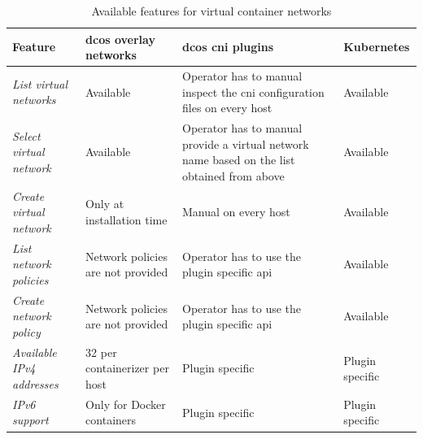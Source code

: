 \begin{table}
\centering
\renewcommand*{\arraystretch}{1.4}
\begin{tabular}{|p{4cm}|p{2.5cm}|p{4cm}|p{2.5cm}|}\hline 
 \textbf{Feature} & \textbf{\gls{dcos} overlay networks} & \textbf{\gls{dcos} \gls{cni} plugins} & \textbf{Kubernetes}\\ \hline
 \textit{List virtual networks} & Available & Operator has to manual inspect the \gls{cni} configuration files on every host & Available \\ \hline
 \textit{Select virtual network} & Available & Operator has to manual provide a virtual network name based on the list obtained from above & Available \\ \hline
 \textit{Create virtual network} & Only at installation time & Manual on every host & Available \\ \hline
 \textit{List network policies} & Network policies are not provided & Operator has to use the plugin specific \gls{api}  & Available \\ \hline
 \textit{Create network policy} & Network policies are not provided & Operator has to use the plugin specific \gls{api} & Available \\ \hline
 \textit{Available IPv4 addresses} & 32 per containerizer per host & Plugin specific & Plugin specific \\ \hline
 \textit{IPv6 support} & Only for Docker containers & Plugin specific & Plugin specific \\ \hline
\end{tabular}
\caption{Available features for virtual container networks}
\label{tab:problems}
\end{table}
